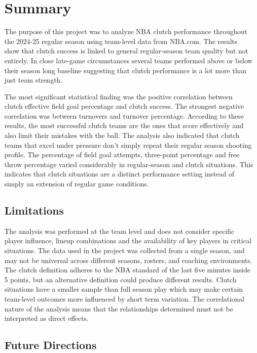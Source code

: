 \section{Summary}

\begin{sloppypar}
The purpose of this project was to analyze NBA clutch performance throughout the 2024-25 regular season using team-level data from NBA.com. The results show that clutch success is linked to general regular-season team quality but not entirely. In close late-game circumstances several teams performed above or below their season long baseline suggesting that clutch performance is a lot more than just team strength.

The most significant statistical finding was the positive correlation between clutch effective field goal percentage and clutch success. The strongest negative correlation was between turnovers and turnover percentage. According to these results, the most successful clutch teams are the ones that score effectively and also limit their mistakes with the ball. The analysis also indicated that clutch teams that excel under pressure don't simply repeat their regular season shooting profile. The percentage of field goal attempts, three-point percentage and free throw percentage varied considerably in regular-season and clutch situations. This indicates that clutch situations are a distinct performance setting instead of simply an extension of regular game conditions.

\subsection{Limitations}

The analysis was performed at the team level and does not consider specific player influence, lineup combinations and the availability of key players in critical situations. The data used in the project was collected from a single season, and may not be universal across different seasons, rosters, and coaching environments. The clutch definition adheres to the NBA standard of the last five minutes inside 5 points, but an alternative definition could produce different results. Clutch situations have a smaller sample than full season play which may make certain team-level outcomes more influenced by short term variation. The correlational nature of the analysis means that the relationships determined must not be interpreted as direct effects.

\subsection{Future Directions}


\end{sloppypar}
